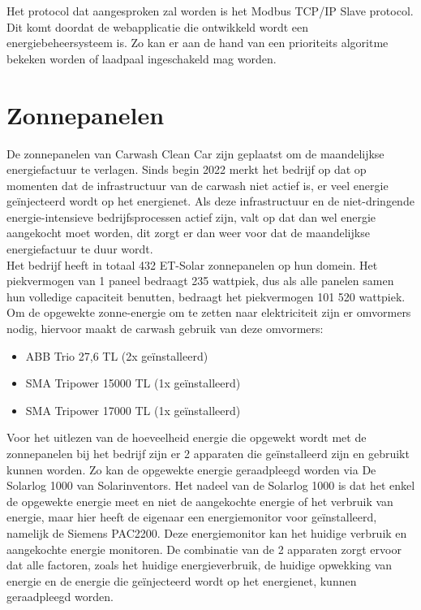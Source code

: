Het protocol dat aangesproken zal worden is het Modbus TCP/IP Slave protocol. Dit komt doordat de webapplicatie die ontwikkeld wordt een energiebeheersysteem is. Zo kan er aan de hand van een prioriteits algoritme bekeken worden of laadpaal ingeschakeld mag worden.

\section{Zonnepanelen}
\label{sec:stand-van-zaken-zonnepanelen}

De zonnepanelen van Carwash Clean Car zijn geplaatst om de maandelijkse energiefactuur te verlagen. Sinds begin 2022 merkt het bedrijf op dat op momenten dat de infrastructuur van de carwash niet actief is, er veel energie geïnjecteerd wordt op het energienet. Als deze infrastructuur en de niet-dringende energie-intensieve bedrijfsprocessen actief zijn, valt op dat dan wel energie aangekocht moet worden, dit zorgt er dan weer voor dat de maandelijkse energiefactuur te duur wordt.\\

Het bedrijf heeft in totaal 432 ET-Solar zonnepanelen op hun domein. Het piekvermogen van 1 paneel bedraagt 235 wattpiek, dus als alle panelen samen hun volledige capaciteit benutten, bedraagt het piekvermogen 101 520 wattpiek. Om de opgewekte zonne-energie om te zetten naar elektriciteit zijn er omvormers nodig, hiervoor maakt de carwash gebruik van deze omvormers:

\begin{itemize}
    \item ABB Trio 27,6 TL (2x geïnstalleerd)
    \item SMA Tripower 15000 TL (1x geïnstalleerd)
    \item SMA Tripower 17000 TL (1x geïnstalleerd)
\end{itemize}

Voor het uitlezen van de hoeveelheid energie die opgewekt wordt met de zonnepanelen bij het bedrijf zijn er 2 apparaten die geïnstalleerd zijn en gebruikt kunnen worden. Zo kan de opgewekte energie geraadpleegd worden via De Solarlog 1000 van Solarinventors. Het nadeel van de Solarlog 1000 is dat het enkel de opgewekte energie meet en niet de aangekochte energie of het verbruik van energie, maar hier heeft de eigenaar een energiemonitor voor geïnstalleerd, namelijk de Siemens PAC2200. Deze energiemonitor kan het huidige verbruik en aangekochte energie monitoren. De combinatie van de 2 apparaten zorgt ervoor dat alle factoren, zoals het huidige energieverbruik, de huidige opwekking van energie en de energie die geïnjecteerd wordt op het energienet, kunnen geraadpleegd worden.\\

